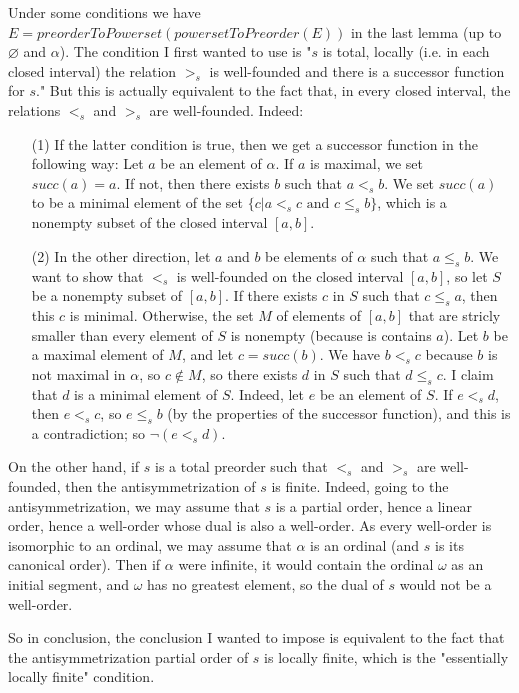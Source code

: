 Under some conditions we have $E=preorderToPowerset(powersetToPreorder(E))$ in the last lemma (up to $\varnothing$ and $\alpha$). 
The condition I first wanted to use is "$s$ is total, locally (i.e. in each closed interval) the relation $>_s$ is well-founded 
and there is a successor function for $s$." But this is actually equivalent to the fact that, in every closed interval, the relations
$<_s$ and $>_s$ are well-founded. Indeed:
\begin{itemize}
\item[(1)]If the latter condition is true, then we get a successor function in the following way: Let $a$ be an element of $\alpha$. 
If $a$ is maximal, we set $succ(a) = a$. If not, then there exists $b$ such that $a <_s b$. We set $succ(a)$ to be a minimal element 
of the set $\{c | a <_s c \mbox{ and } c \le_s b\}$, which is a nonempty subset of the closed interval $[a,b]$. 
\item[(2)] In the other direction, let $a$ and $b$ be elements of $\alpha$ such that $a \le_s b$. We want to show that $<_s$ is 
well-founded on the closed interval $[a,b]$, so let $S$ be a nonempty subset of $[a,b]$. If there exists $c$ in $S$ such that $c \le_s a$, 
then this $c$ is minimal. Otherwise, the set $M$ of elements of $[a,b]$ that are stricly smaller than every element of $S$ is nonempty 
(because is contains $a$). Let $b$ be a maximal element of $M$, and let $c = succ(b)$. We have $b <_s c$ because $b$ is not maximal in
$\alpha$, so $c \not\in  M$, so there exists $d$ in $S$ such that $d \le_s c$. I claim that $d$ is a minimal element of $S$. Indeed, let 
$e$ be an element of $S$. If $e <_s d$, then $e <_s c$, so $e \le_s b$ (by the properties of the successor function), and this is a 
contradiction; so $\neg(e <_s d)$.
\end{itemize}

On the other hand, if $s$ is a total preorder such that $<_s$ and $>_s$ are well-founded, then the antisymmetrization of $s$ is finite. 
Indeed, going to the antisymmetrization, we may assume that $s$ is a partial order, hence a linear order, hence a well-order whose dual
is also a well-order. As every well-order is isomorphic to an ordinal, we may assume that $\alpha$ is an ordinal (and $s$ is its canonical
order). Then if $\alpha$ were infinite, it would contain the ordinal $\omega$ as an initial segment, and $\omega$ has no greatest element, 
so the dual of $s$ would not be a well-order.
  
So in conclusion, the conclusion I wanted to impose is equivalent to the fact that the antisymmetrization partial order of $s$ is
locally finite, which is the "essentially locally finite" condition.

